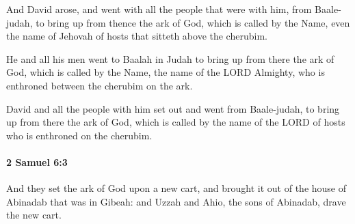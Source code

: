 			\begin{versebox}
					\item[BHS] 
					\item[ASV] And David arose, and went with all the people that were with him, from Baale-judah, to bring up from thence the ark of God, which is called by the Name, even the name of Jehovah of hosts that sitteth above the cherubim.
					\item[NIV] He and all his men went to Baalah in Judah to bring up from there the ark of God, which is called by the Name, the name of the LORD Almighty, who is enthroned between the cherubim on the ark.
					\item[NRSV] David and all the people with him set out and went from Baale-judah, to bring up from there the ark of God, which is called by the name of the LORD of hosts who is enthroned on the cherubim.
			\end{versebox}

		\paragraph{2 Samuel 6:3} %
			\label{2SAMUEL-6-3}

			And they set the ark of God upon a new cart, and brought it out of the house of Abinadab that was in Gibeah: and Uzzah and Ahio, the sons of Abinadab, drave the new cart.

